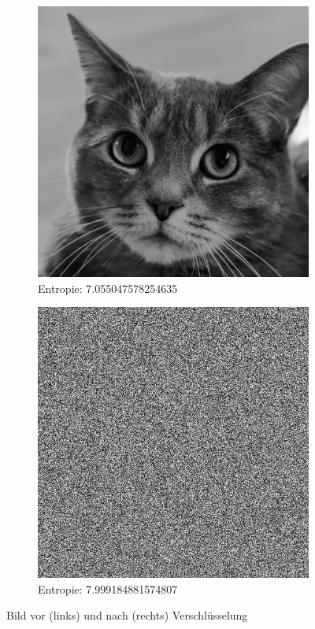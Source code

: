 \begin{figure}
	\centering

	\begin{subfigure}{0.35\textwidth}
		\includegraphics[width=\textwidth]{3/gray_7.055047578254635_cat.jpg}
		\caption{Entropie: 7.055047578254635}
	\end{subfigure}
	\hfill
	\begin{subfigure}{0.35\textwidth}
		\includegraphics[width=\textwidth]{../1/3/encrypted_7.999306298374896_cat.jpg}
		\caption{Entropie: 7.999184881574807}
	\end{subfigure}

	\caption{Bild vor (links) und nach (rechts) Verschlüsselung}
	\label{fig:cat}
\end{figure}

